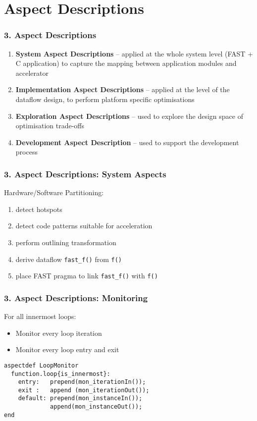 \section{Aspect Descriptions}
\begin{frame}
  \frametitle{3. Aspect Descriptions}
\begin{enumerate}
\item \textbf{System Aspect Descriptions} -- applied at the whole
  system level (FAST + C application) to capture the mapping
  between application modules and accelerator
\item \textbf{Implementation Aspect Descriptions} -- applied at the
  level of the dataflow design, to perform platform specific
  optimisations
\item \textbf{Exploration Aspect Descriptions} -- used to explore the
  design space of optimisation trade-offs
\item \textbf{Development Aspect Description}  -- used to support
    the development process
\end{enumerate}
\end{frame}

\begin{frame}
  \frametitle{3. Aspect Descriptions: System Aspects}
Hardware/Software Partitioning:
\begin{enumerate}
  \item detect hotspots
  \item detect code patterns suitable for acceleration
  \item perform outlining transformation
  \item derive dataflow \texttt{fast\_f()} from \texttt{f()}
  \item place FAST pragma to link \texttt{fast\_f()} with \texttt{f()}
\end{enumerate}
\end{frame}


\begin{frame}[fragile]
  \frametitle{3. Aspect Descriptions: Monitoring}
  For all innermost loops:
\begin{itemize}
  \item Monitor every loop iteration
  \item Monitor every loop entry and exit
\end{itemize}
\begin{lstlisting}[label=lst:label, style=lara]
aspectdef LoopMonitor
  function.loop{is_innermost}:
    entry:   prepend(mon_iterationIn());
    exit :   append (mon_iterationOut());
    default: prepend(mon_instanceIn());
             append(mon_instanceOut());
end
\end{lstlisting}
\end{frame}

